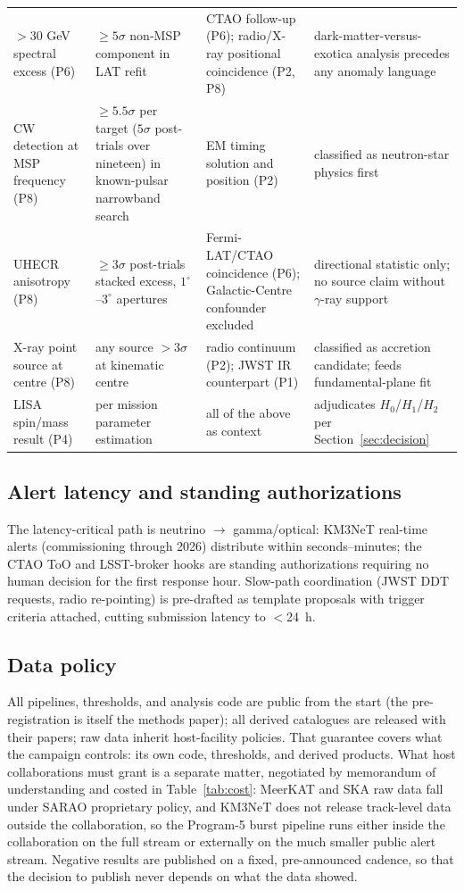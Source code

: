 \documentclass[11pt]{article}
\begin{document}
\begin{table}[tbp]
\begin{tabular}{p{3.4cm}p{2.6cm}p{3.6cm}p{4.0cm}}
$>$30 GeV spectral excess (P6) & $\geq 5\sigma$ non-MSP component in LAT refit & CTAO follow-up (P6); radio/X-ray positional coincidence (P2, P8) & dark-matter-versus-exotica analysis precedes any anomaly language \\
CW detection at MSP frequency (P8) & $\geq 5.5\sigma$ per target ($5\sigma$ post-trials over nineteen) in known-pulsar narrowband search & EM timing solution and position (P2) & classified as neutron-star physics first \\
UHECR anisotropy (P8) & $\geq 3\sigma$ post-trials stacked excess, $1^{\circ}$--$3^{\circ}$ apertures & Fermi-LAT/CTAO coincidence (P6); Galactic-Centre confounder excluded & directional statistic only; no source claim without $\gamma$-ray support \\
X-ray point source at centre (P8) & any source $>3\sigma$ at kinematic centre & radio continuum (P2); JWST IR counterpart (P1) & classified as accretion candidate; feeds fundamental-plane fit \\
LISA spin/mass result (P4) & per mission parameter estimation & all of the above as context & adjudicates $H_0$/$H_1$/$H_2$ per Section~\ref{sec:decision} \\
\bottomrule
\end{tabular}
\end{table}

\subsection{Alert latency and standing authorizations}

The latency-critical path is neutrino $\rightarrow$ gamma/optical: KM3NeT real-time alerts (commissioning through 2026) distribute within seconds--minutes; the CTAO ToO and LSST-broker hooks are standing authorizations requiring no human decision for the first response hour. Slow-path coordination (JWST DDT requests, radio re-pointing) is pre-drafted as template proposals with trigger criteria attached, cutting submission latency to $<$24~h.

\subsection{Data policy}

All pipelines, thresholds, and analysis code are public from the start (the pre-registration is itself the methods paper); all derived catalogues are released with their papers; raw data inherit host-facility policies. That guarantee covers what the campaign controls: its own code, thresholds, and derived products. What host collaborations must grant is a separate matter, negotiated by memorandum of understanding and costed in Table~\ref{tab:cost}: MeerKAT and SKA raw data fall under SARAO proprietary policy, and KM3NeT does not release track-level data outside the collaboration, so the Program-5 burst pipeline runs either inside the collaboration on the full stream or externally on the much smaller public alert stream. Negative results are published on a fixed, pre-announced cadence, so that the decision to publish never depends on what the data showed.
\end{document}

